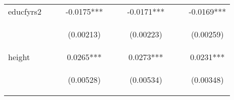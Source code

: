 \documentclass[]{article}
\begin{document}
\begin{center}
\begin{tabular}{lccccccccc}
educfyrs2 &  &  & -0.0175*** &  &  & -0.0171*** &  &  & -0.0169*** \\
\vspace{4pt} & \begin{footnotesize}\end{footnotesize} & \begin{footnotesize}\end{footnotesize} & \begin{footnotesize}(0.00213)\end{footnotesize} & \begin{footnotesize}\end{footnotesize} & \begin{footnotesize}\end{footnotesize} & \begin{footnotesize}(0.00223)\end{footnotesize} & \begin{footnotesize}\end{footnotesize} & \begin{footnotesize}\end{footnotesize} & \begin{footnotesize}(0.00259)\end{footnotesize} \\
height &  &  & 0.0265*** &  &  & 0.0273*** &  &  & 0.0231*** \\
\vspace{4pt} & \begin{footnotesize}\end{footnotesize} & \begin{footnotesize}\end{footnotesize} & \begin{footnotesize}(0.00528)\end{footnotesize} & \begin{footnotesize}\end{footnotesize} & \begin{footnotesize}\end{footnotesize} & \begin{footnotesize}(0.00534)\end{footnotesize} & \begin{footnotesize}\end{footnotesize} & \begin{footnotesize}\end{footnotesize} & \begin{footnotesize}(0.00348)\end{footnotesize} \\

\end{tabular}
\end{center}
\end{document}
